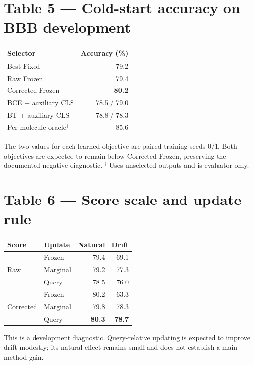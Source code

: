 \documentclass[10pt]{article}
\newcommand{\smallnote}[1]{{\footnotesize\color{Gray}#1}}
\begin{document}
\clearpage
\section*{Table 5 --- Cold-start accuracy on BBB development}
\begin{tabularx}{\linewidth}{@{}lr@{}}
\toprule
Selector & Accuracy (\%) \\
\midrule
Best Fixed & 79.2 \\
Raw Frozen & 79.4 \\
Corrected Frozen & \textbf{80.2} \\
\midrule
BCE + auxiliary CLS & 78.5 / 79.0 \\
BT + auxiliary CLS & 78.8 / 78.3 \\
\midrule
Per-molecule oracle$^{\dagger}$ & 85.6 \\
\bottomrule
\end{tabularx}
\smallnote{The two values for each learned objective are paired training seeds 0/1. Both objectives are expected to remain below Corrected Frozen, preserving the documented negative diagnostic. $^{\dagger}$ Uses unselected outputs and is evaluator-only.}

\section*{Table 6 --- Score scale and update rule}
\begin{tabularx}{\linewidth}{@{}llrr@{}}
\toprule
Score & Update & Natural & Drift \\
\midrule
\multirow{3}{*}{Raw} & Frozen & 79.4 & 69.1 \\
& Marginal & 79.2 & 77.3 \\
& Query & 78.5 & 76.0 \\
\midrule
\multirow{3}{*}{Corrected} & Frozen & 80.2 & 63.3 \\
& Marginal & 79.8 & 78.3 \\
& Query & \textbf{80.3} & \textbf{78.7} \\
\bottomrule
\end{tabularx}
\smallnote{This is a development diagnostic. Query-relative updating is expected to improve drift modestly; its natural effect remains small and does not establish a main-method gain.}
\end{document}

